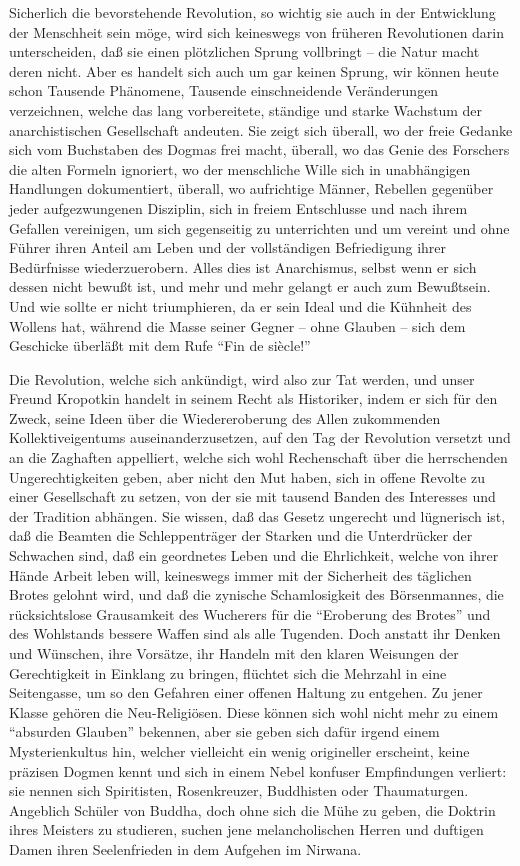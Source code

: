 \documentclass{scrbook}
\begin{document}
Sicherlich die bevorstehende Revolution, so wichtig sie auch in der Entwicklung der Menschheit sein möge, wird sich keineswegs von früheren Revolutionen darin unterscheiden, daß sie einen plötzlichen Sprung vollbringt – die Natur macht deren nicht. Aber es handelt sich auch um gar keinen Sprung, wir können heute schon Tausende Phänomene, Tausende einschneidende Veränderungen verzeichnen, welche das lang vorbereitete, ständige und starke Wachstum der anarchistischen Gesellschaft andeuten. Sie zeigt sich überall, wo der freie Gedanke sich vom Buchstaben des Dogmas frei macht, überall, wo das Genie des Forschers die alten Formeln ignoriert, wo der menschliche Wille sich in unabhängigen Handlungen dokumentiert, überall, wo aufrichtige Männer, Rebellen gegenüber jeder aufgezwungenen Disziplin, sich in freiem Entschlusse und nach ihrem Gefallen vereinigen, um sich gegenseitig zu unterrichten und um vereint und ohne Führer ihren Anteil am Leben und der vollständigen Befriedigung ihrer Bedürfnisse wiederzuerobern. Alles dies ist Anarchismus, selbst wenn er sich dessen nicht bewußt ist, und mehr und mehr gelangt er auch zum Bewußtsein. Und wie sollte er nicht triumphieren, da er sein Ideal und die Kühnheit des Wollens hat, während die Masse seiner Gegner – ohne Glauben – sich dem Geschicke überläßt mit dem Rufe ``Fin de siècle!''

Die Revolution, welche sich ankündigt, wird also zur Tat werden, und unser Freund Kropotkin handelt in seinem Recht als Historiker, indem er sich für den Zweck, seine Ideen über die Wiedereroberung des Allen zukommenden Kollektiveigentums auseinanderzusetzen, auf den Tag der Revolution versetzt und an die Zaghaften appelliert, welche sich wohl Rechenschaft über die herrschenden Ungerechtigkeiten geben, aber nicht den Mut haben, sich in offene Revolte zu einer Gesellschaft zu setzen, von der sie mit tausend Banden des Interesses und der Tradition abhängen. Sie wissen, daß das Gesetz ungerecht und lügnerisch ist, daß die Beamten die Schleppenträger der Starken und die Unterdrücker der Schwachen sind, daß ein geordnetes Leben und die Ehrlichkeit, welche von ihrer Hände Arbeit leben will, keineswegs immer mit der Sicherheit des täglichen Brotes gelohnt wird, und daß die zynische Schamlosigkeit des Börsenmannes, die rücksichtslose Grausamkeit des Wucherers für die ``Eroberung des Brotes'' und des Wohlstands bessere Waffen sind als alle Tugenden. Doch anstatt ihr Denken und Wünschen, ihre Vorsätze, ihr Handeln mit den klaren Weisungen der Gerechtigkeit in Einklang zu bringen, flüchtet sich die Mehrzahl in eine Seitengasse, um so den Gefahren einer offenen Haltung zu entgehen. Zu jener Klasse gehören die Neu-Religiösen. Diese können sich wohl nicht mehr zu einem ``absurden Glauben'' bekennen, aber sie geben sich dafür irgend einem Mysterienkultus hin, welcher vielleicht ein wenig origineller erscheint, keine präzisen Dogmen kennt und sich in einem Nebel konfuser Empfindungen verliert: sie nennen sich Spiritisten, Rosenkreuzer, Buddhisten oder Thaumaturgen. Angeblich Schüler von Buddha, doch ohne sich die Mühe zu geben, die Doktrin ihres Meisters zu studieren, suchen jene melancholischen Herren und duftigen Damen ihren Seelenfrieden in dem Aufgehen im Nirwana.
\end{document}
